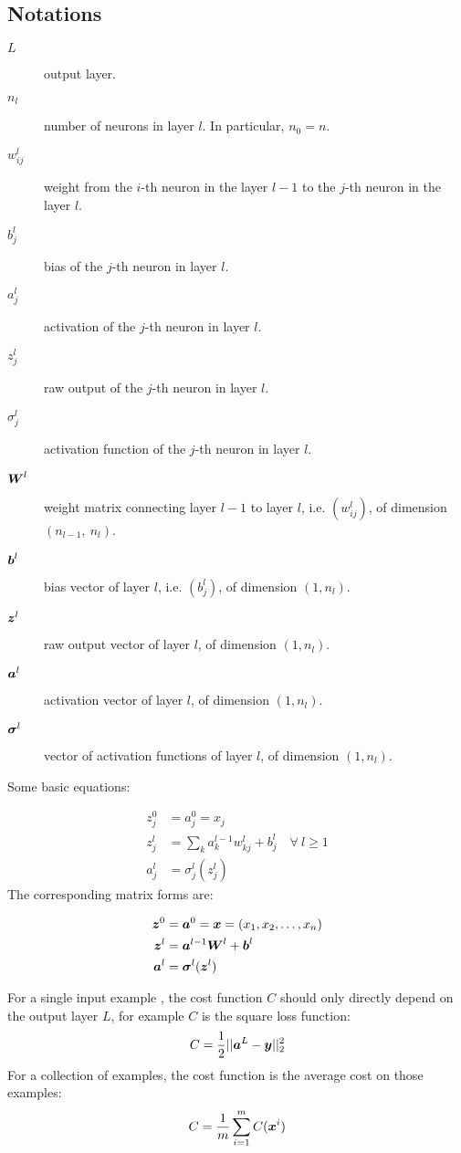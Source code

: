 \subsection{Notations}
\begin{description}
    \item[$L$] output layer.
    \item[$n_l$] number of neurons in layer $l$. In particular, $n_0 = n$.
    \item[$w^l_{ij}$] weight from the $i$-th neuron in the layer $l-1$ to the $j$-th neuron in the layer $l$.
    \item[$b^l_j$] bias of the $j$-th neuron in layer $l$.
    \item[$a^l_j$] activation of the $j$-th neuron in layer $l$.
    \item[$z^l_j$] raw output of the $j$-th neuron in layer $l$.
    \item[$\sigma^l_j$] activation function of the $j$-th neuron in layer $l$.
    \item[$\boldsymbol{W}^l$] weight matrix connecting layer $l-1$ to layer $l$, i.e. $(w^l_{ij})$, of dimension 
    $(n_{l-1},\ n_l)$.
    \item[$\boldsymbol{b}^l$] bias vector of layer $l$, i.e. $(b^l_j)$, of dimension $(1, n_l)$.
    \item[$\boldsymbol{z}^l$] raw output vector of layer $l$, of dimension $(1, n_l)$.
    \item[$\boldsymbol{a}^l$] activation vector of layer $l$, of dimension $(1, n_l)$.
    \item[$\boldsymbol{\sigma}^l$] vector of activation functions of layer $l$, of dimension $(1, n_l)$.
\end{description}
\newpage
Some basic equations:

\begin{align}
    z^0_j &= a^0_j = x_j\\
    z^l_j &= \sum_k a^{l-1}_{k} w^l_{kj} + b^l_j\quad\forall~l\geq 1\\
    a^l_j &= \sigma^l_j(z^l_j)
\end{align}
The corresponding matrix forms are:

\begin{align}
    \boldsymbol{z}^0 &= \boldsymbol{a}^0 = \boldsymbol{x} = (x_1, x_2, \ldots, x_{n})\\
    \boldsymbol{z}^l &= \boldsymbol{a}^{l-1} \boldsymbol{W}^l + \boldsymbol{b}^l\\
    \boldsymbol{a}^l &= \boldsymbol{\sigma}^l(\boldsymbol{z}^l)
\end{align}

For a single input example , the cost function $C$ should only directly depend on the output layer $L$,
for example $C$ is the square loss function:
\begin{equation}\label{nn_square_loss}
    C = \frac{1}{2} ||\boldsymbol{a}^L - \boldsymbol{y}||^2_2
\end{equation}
For a collection of examples, the cost function is the average cost on those examples:
\begin{equation}
    C = \frac{1}{m} \sum_{i=1}^m C(\boldsymbol{x}^i)
\end{equation}

